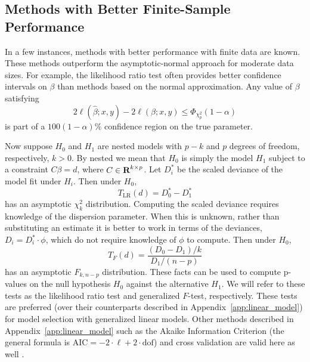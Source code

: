 \documentclass[12pt]{article}
\begin{document}
\subsection{Methods with Better Finite-Sample Performance}
In a few instances, methods with better performance with finite data are known. These methods outperform the asymptotic-normal approach for moderate data sizes.  For example, the likelihood ratio test often provides better confidence intervals on $\beta$ than methods based on the normal approximation. Any value of $\beta$ satisfying 
\begin{displaymath}
   2 \ell(\hat{\beta}; x, y) - 2 \ell(\beta; x, y) \leq \Phi_{\chi_p^2}(1 - \alpha)
\end{displaymath}
is part of a $100(1-\alpha)\%$ confidence region on the true parameter.

Now suppose $H_0$ and $H_1$ are nested models with $p-k$ and $p$ degrees of freedom, respectively, $k > 0$. By nested we mean that $H_0$ is simply the model $H_1$ subject to a constraint $C \beta = d$, where $C \in {\mbox{\bf R}}^{k\times p}$. Let $D_i^*$ be the scaled deviance of the model fit under $H_i$. Then under $H_0$,
\begin{displaymath}
   T_{\textrm{LR}}(d) = D_0^* - D_1^*
\end{displaymath}
has an asymptotic $\chi_{k}^2$ distribution. Computing the scaled deviance requires knowledge of the dispersion parameter. When this is unknown, rather than substituting an estimate it is better to work in terms of the deviances, $D_i = D_i^* \cdot \phi$, which do not require knowledge of $\phi$ to compute. Then under $H_0$,
\begin{displaymath}
   T_F(d) = \frac{(D_0 - D_1) / k}{D_1 / (n - p)}
\end{displaymath}
has an asymptotic $F_{k, n-p}$ distribution. These facts can be used to compute p-values on the null hypothesis $H_0$ against the alternative $H_1$. We will refer to these tests as the likelihood ratio test and generalized $F$-test, respectively. These tests are preferred (over their counterparts described in Appendix~\ref{app:linear_model}) for model selection with generalized linear models. Other methods described in Appendix~\ref{app:linear_model} such as the Akaike Information Criterion (the general formula is $\textrm{AIC} = -2 \cdot \ell + 2 \cdot \textrm{dof}$) and cross validation are valid here as well \cite[\S 3.1.4]{Wood:2017}.
\end{document}
